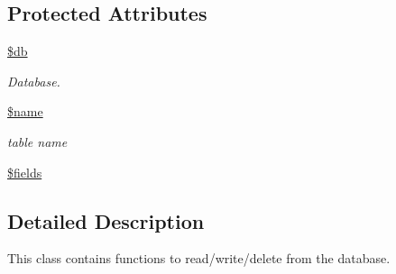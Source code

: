 \subsection*{Protected Attributes}
\begin{DoxyCompactItemize}
\item 
\hyperlink{class_table_a1fa3127fc82f96b1436d871ef02be319}{\$db}
\begin{DoxyCompactList}\small\item\em Database. \end{DoxyCompactList}\item 
\hyperlink{class_table_ab2fc40d43824ea3e1ce5d86dee0d763b}{\$name}
\begin{DoxyCompactList}\small\item\em table name \end{DoxyCompactList}\item 
\hyperlink{class_table_ab2303c817e3b402b77b7f99627b9c319}{\$fields}
\end{DoxyCompactItemize}


\subsection{Detailed Description}
This class contains functions to read/write/delete from the database. 

